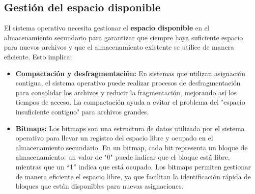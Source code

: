 \subsection{Gestión del espacio disponible}

El sistema operativo necesita gestionar el \textbf{espacio disponible} en el almacenamiento secundario para garantizar que siempre haya suficiente espacio para nuevos archivos y que el almacenamiento existente se utilice de manera eficiente. Esto implica:

\begin{itemize}
		
	\item \textbf{Compactación y desfragmentación:} En sistemas que utilizan asignación contigua, el sistema operativo puede realizar procesos de desfragmentación para consolidar los archivos y reducir la fragmentación, mejorando así los tiempos de acceso. La compactación ayuda a evitar el problema del "espacio insuficiente contiguo" para archivos grandes.
\item \textbf{Bitmaps:} Los bitmaps son una estructura de datos utilizada por el sistema operativo para llevar un registro del espacio libre y ocupado en el almacenamiento secundario. En un bitmap, cada bit representa un bloque de almacenamiento: un valor de "0" puede indicar que el bloque está libre, mientras que un ``1'' indica que está ocupado. Los bitmaps permiten gestionar de manera eficiente el espacio libre, ya que facilitan la identificación rápida de bloques que están disponibles para nuevas asignaciones.
\end{itemize}
